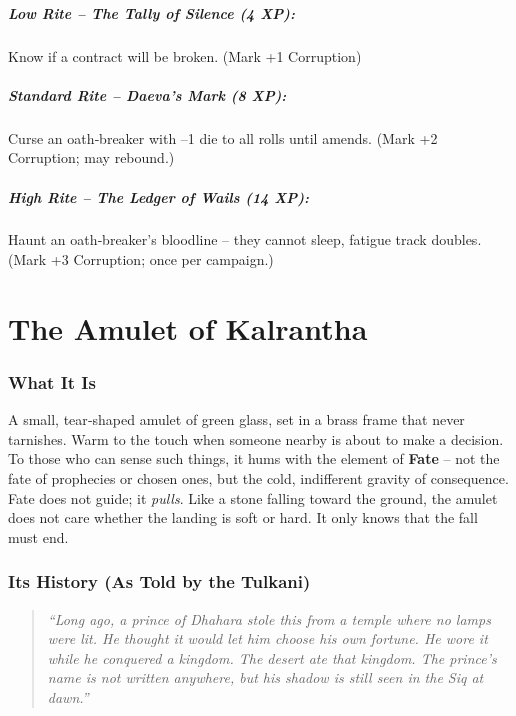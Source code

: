 \documentclass[11pt]{book}
\newenvironment{lorebox}{\begin{quote}\small\itshape}{\end{quote}}
\begin{document}
\paragraph{Low Rite -- The Tally of Silence (4 XP):} Know if a contract will be broken. (Mark +1 Corruption)
\paragraph{Standard Rite -- Daeva’s Mark (8 XP):} Curse an oath‑breaker with –1 die to all rolls until amends. (Mark +2 Corruption; may rebound.)
\paragraph{High Rite -- The Ledger of Wails (14 XP):} Haunt an oath‑breaker’s bloodline – they cannot sleep, fatigue track doubles. (Mark +3 Corruption; once per campaign.)

\clearpage
\chapter{The Amulet of Kalrantha}
\label{chap:kalrantha}

\subsection*{What It Is}
A small, tear‑shaped amulet of green glass, set in a brass frame that never tarnishes. Warm to the touch when someone nearby is about to make a decision. To those who can sense such things, it hums with the element of \textbf{Fate} – not the fate of prophecies or chosen ones, but the cold, indifferent gravity of consequence. Fate does not guide; it \textit{pulls}. Like a stone falling toward the ground, the amulet does not care whether the landing is soft or hard. It only knows that the fall must end.

\subsection*{Its History (As Told by the Tulkani)}
\begin{lorebox}
“Long ago, a prince of Dhahara stole this from a temple where no lamps were lit. He thought it would let him choose his own fortune. He wore it while he conquered a kingdom. The desert ate that kingdom. The prince’s name is not written anywhere, but his shadow is still seen in the Siq at dawn.”
\end{lorebox}
\end{document}
